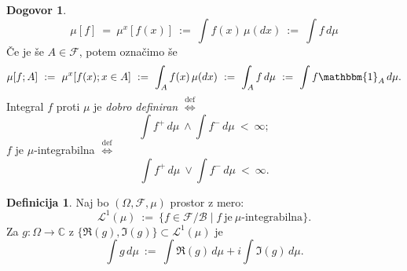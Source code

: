 \documentclass[11pt]{article}
\newcommand{\B}{\mathcal{B}}
\newcommand{\F}{\mathcal{F}}
\renewcommand{\L}{\mathcal{L}}
\newcommand{\diff}{\overset{\text{def}}{\iff}}
\newcommand{\set}[1]{\{#1\}}
\newcommand{\1}{\mathbbm{1}}
\theoremstyle{definition}
\newtheorem{definicija}{Definicija}[section]
\theoremstyle{definition}
\theoremstyle{definition}
\theoremstyle{definition}
\newtheorem*{dogovor}{Dogovor}
\begin{document}
\begin{dogovor}

$$\mu[f] ~=~ \mu^x[f(x)] ~:=~ \int f(x)\,\mu(dx) ~:=~ \int f\,d\mu$$
Če je še $A \in \F$, potem označimo še
$$\mu[f; A] ~:=~ \mu^x[f(x); x \in A] ~:=~ \int_A f(x)\,\mu(dx) ~:=~ \int_A f\,d\mu ~:=~ \int f\1_A\,d\mu.$$
Integral $f$ proti $\mu$ je \textit{dobro definiran} $\diff$
$$\int f^+\,d\mu ~\wedge \int f^-\,d\mu ~<~ \infty;$$
$f$ je $\mu$-integrabilna $\diff$
$$\int f^+\,d\mu ~\vee \int f^-\,d\mu ~<~ \infty.$$

\end{dogovor}
\vspace{0.5cm}

\begin{definicija}

Naj bo $(\Omega, \F, \mu)$ prostor z mero:
$$\L^1(\mu) ~:=~ \set{f \in \F/\B \mid f ~\text{je}~ \mu\text{-integrabilna}}.$$
Za $g: \Omega \rightarrow \mathbb{C}$ z $\set{\mathfrak{R}(g), \mathfrak{I}(g)} \subset \L^1(\mu)$ je
$$\int g\,d\mu ~:=~ \int \mathfrak{R}(g)\,d\mu + i\int \mathfrak{I}(g)\,d\mu.$$

\end{definicija}
\vspace{0.5cm}
\end{document}
